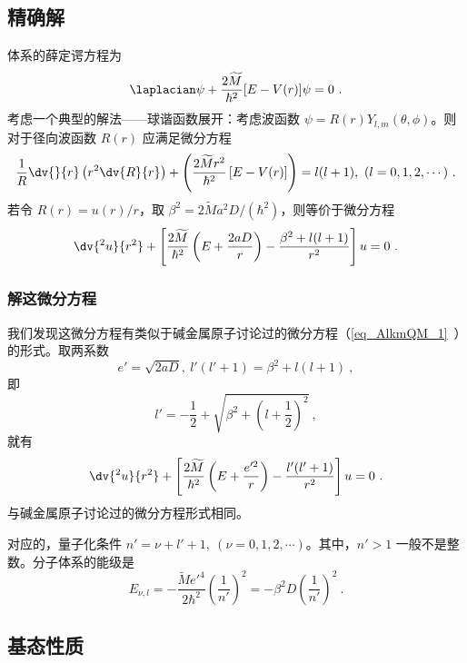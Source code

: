 \subsection{精确解}
体系的薛定谔方程为
\begin{equation}
\laplacian \psi + \frac{2 \widetilde M}{\hbar^2} [E - V(r)] \psi = 0~.
\end{equation}
考虑一个典型的解法——球谐函数展开：考虑波函数 $\psi = R(r) Y_{l, m} (\theta, \phi)$。则对于径向波函数 $R(r)$ 应满足微分方程
\begin{equation}
\frac1R \dv{}{r}\left(r^2 \dv{R}{r}\right) + \left( \frac{2\widetilde M r^2}{\hbar^2} \left[E-V(r)\right] \right) = l(l+1), \ (l = 0, 1, 2, \cdots) ~.
\end{equation}
若令 $R(r) = u(r)/r$，取 $\beta^2=2\widetilde M a^2 D/(\hbar^2)$，则等价于微分方程
\begin{equation}
\dv{^2 u}{r^2} + \left[\frac{2\widetilde M}{\hbar^2} \left(E + \frac{2aD}{r}\right) - \frac{\beta^2 + l(l+1)}{r^2}\right] u = 0 ~.
\end{equation}

\subsubsection{解这微分方程}
我们发现这微分方程有类似于碱金属原子讨论过的微分方程（\autoref{eq_AlkmQM_1}~）的形式。取两系数
\begin{equation}
e' = \sqrt{2aD},\ l'(l'+1) = \beta^2 + l(l+1) ~,
\end{equation}
即
$$l' = -\frac12 + \sqrt{\beta^2 + \left(l + \frac12\right)^2} ~,$$
就有
\begin{equation}
\dv{^2 u}{r^2} + \left[ \frac{2 \widetilde M}{\hbar^2} \left(E + \frac{e'^2}{r}\right)  - \frac{l'(l'+1)}{r^2}\right] u = 0 ~.
\end{equation}
与碱金属原子讨论过的微分方程形式相同。

对应的，量子化条件 $n' = \nu + l' + 1, \ (\nu = 0, 1, 2, \cdots)$。其中，$n' > 1$ 一般不是整数。分子体系的能级是
\begin{equation}
E_{\nu, l} = -\frac{\widetilde M e'^4}{2 \hbar^2} \left(\frac1{n'}\right)^2 = -\beta^2 D \left(\frac{1}{n'}\right)^2 ~.
\end{equation}

\subsection{基态性质}
